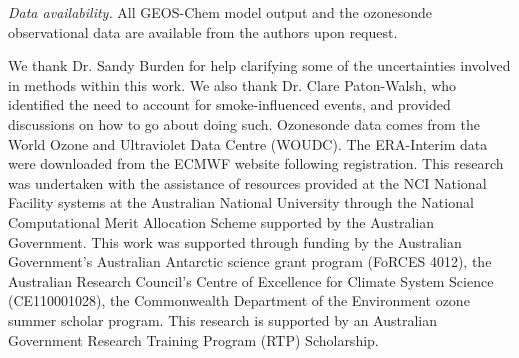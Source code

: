 \documentclass[acp, manuscript]{copernicus} %
\begin{document}


%
\textit{Data availability.} All GEOS-Chem model output and the ozonesonde observational data are available from the authors upon request.

\begin{acknowledgements}
We thank Dr. Sandy Burden for help clarifying some of the uncertainties involved in methods within this work.
We also thank Dr. Clare Paton-Walsh, who identified the need to account for smoke-influenced events, and provided discussions on how to go about doing such.
Ozonesonde data comes from the World Ozone and Ultraviolet Data Centre (WOUDC).
The ERA-Interim data were downloaded from the ECMWF website following registration.
This research was undertaken with the assistance of resources provided at the NCI National Facility systems at the Australian National University through the National Computational Merit Allocation Scheme supported by the Australian Government.
This work was supported through funding by the Australian Government's Australian Antarctic science grant program (FoRCES 4012), the Australian Research Council's Centre of Excellence for Climate System Science (CE110001028), the Commonwealth Department of the Environment ozone summer scholar program.
This research is supported by an Australian Government Research Training Program (RTP) Scholarship.
\end{acknowledgements}



\end{document}
